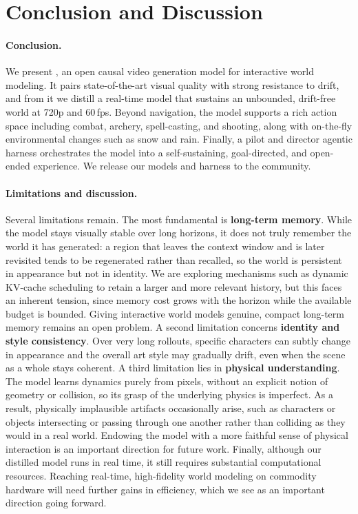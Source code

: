 \section{Conclusion and Discussion}
\paragraph{Conclusion.}
We present \method, an open causal video generation
model for interactive world modeling. It pairs state-of-the-art visual quality with strong resistance to drift, and from it we distill a real-time model that sustains an unbounded, drift-free world at 720p and 60\,fps. Beyond navigation, the model supports a rich action space including combat, archery, spell-casting,
and shooting, along with on-the-fly environmental changes such as snow and rain. Finally, a pilot and director agentic harness orchestrates the model into a self-sustaining, goal-directed, and open-ended experience. We release our models and harness to the community.

\paragraph{Limitations and discussion.}
Several limitations remain. The most fundamental is \textbf{long-term memory}.
While the model stays visually stable over long horizons, it does not truly remember the world it has generated: a region that leaves the context window and is later revisited tends to be regenerated rather than recalled, so the world is persistent in appearance but not in identity. We are exploring mechanisms such as dynamic KV-cache scheduling to retain a larger and more relevant history, but this faces an inherent tension, since memory cost grows with the horizon while the available budget is bounded. Giving interactive world models genuine, compact long-term memory remains an open problem. A second limitation concerns \textbf{identity and style consistency}. Over very long rollouts, specific characters can subtly change in appearance and the overall art style may gradually drift, even when the scene as a whole stays coherent. A third limitation lies in \textbf{physical understanding}. The model learns dynamics purely from pixels, without an explicit notion of geometry or collision, so its grasp of the underlying physics is imperfect. As a result, physically implausible artifacts occasionally arise, such as characters or objects intersecting or passing through one another rather than colliding as they would in a real world. Endowing the model with a more faithful sense of physical interaction is an important direction for future work. Finally, although our distilled model runs in real time, it still requires substantial computational resources. Reaching real-time, high-fidelity world modeling on commodity hardware will need further gains in efficiency, which we see as an important direction going forward.